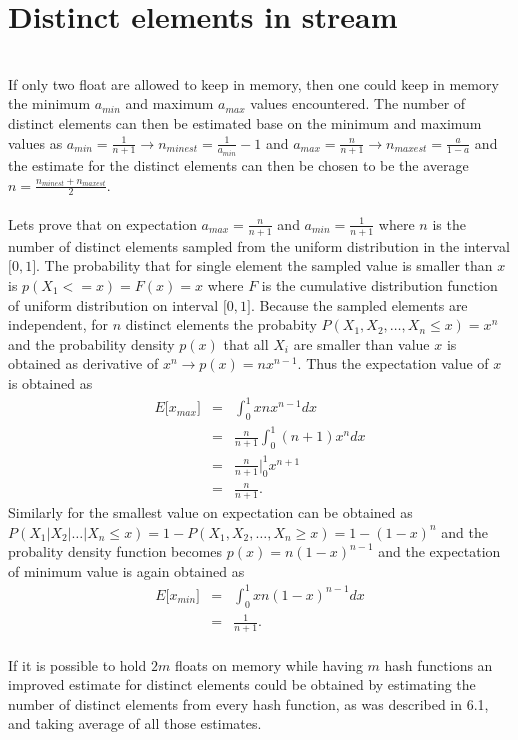 \documentclass[article,11pt]{article}
\begin{document}
\section{Distinct elements in stream}
\\
If only two float are allowed to keep in memory, then one could keep in memory
the minimum $a_{min}$ and maximum $a_{max}$ values encountered. The number of
distinct elements can then be estimated base on the minimum and maximum values
as $a_{min}=\frac{1}{n+1}\rightarrow n_{minest}=\frac{1}{a_{min}}-1$ and $a_{max}=\frac{n}{n+1}\rightarrow n_{maxest}=\frac{a}{1-a}$ and the estimate for the
distinct elements can then be chosen to be the average $n = \frac{n_{minest}+n_{maxest}}{2}$.\\

\\
Lets prove that on expectation $a_{max}=\frac{n}{n+1}$ and $a_{min}=\frac{1}{n+1}$
where $n$ is the number of distinct elements sampled from the uniform distribution in the interval $\lbrack 0,1\rbrack$. The probability that for single
element the sampled value is smaller than $x$ is $p(X_1 <=x)=F(x)=x$ where $F$
is the cumulative distribution function of uniform distribution on interval $\lbrack 0,1\rbrack$. Because the sampled elements are independent, for $n$ distinct
elements the probabity $P({X_1,X_2,\ldots,X_n}\leq x) = x^n$ and the probability
density $p(x)$ that all $X_i$ are smaller than value $x$ is obtained as
derivative of $x^n \rightarrow p(x)=nx^{n-1}$. Thus the expectation value of
$x$ is obtained as
\begin{eqnarray}
  E\lbrack x_{max}\rbrack&=&\int_0^1xnx^{n-1}dx\nonumber\\
  &=&\frac{n}{n+1}\int_0^1(n+1)x^ndx\nonumber\\
  &=&\frac{n}{n+1}\Big|_0^1x^{n+1}\nonumber\\
  &=&\frac{n}{n+1}.
\end{eqnarray}
Similarly for the smallest value on expectation can be obtained as
$P({X_1|X_2|\ldots|X_n}\leq x) = 1 -P({X_1,X_2,\ldots,X_n}\geq x) = 1-(1-x)^n$
and the probality density function becomes $p(x)=n(1-x)^{n-1}$ and the expectation of minimum value is again obtained as
\begin{eqnarray}
  E\lbrack x_{min}\rbrack&=&\int_0^1xn(1-x)^{n-1}dx\nonumber\\
  &=&\frac{1}{n+1}.
\end{eqnarray}
\\
If it is possible to hold $2m$ floats on memory while having $m$ hash functions
an improved estimate for distinct elements could be obtained by estimating
the number of distinct elements from every hash function, as was described in
6.1, and taking average of all those estimates.
\end{document}
